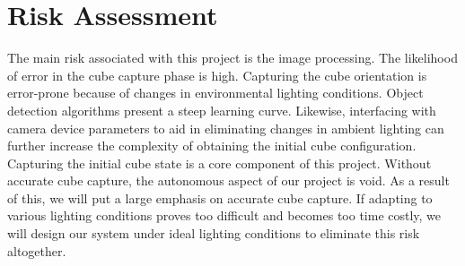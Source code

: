 \documentclass[11pt,english]{article}
\begin{document}
\begin{table}[!ht]
\caption{Main component BOM}
\label{table:BOM}
\end{table}

\section{Risk Assessment}
The main risk associated with this project is the image processing. The likelihood of error in the cube capture phase is high. Capturing the cube orientation is error-prone because of changes in environmental lighting conditions. Object detection algorithms present a steep learning curve. Likewise, interfacing with camera device parameters to aid in eliminating changes in ambient lighting can further increase the complexity of obtaining the initial cube configuration. Capturing the initial cube state is a core component of this project. Without accurate cube capture, the autonomous aspect of our project is void. As a result of this, we will put a large emphasis on accurate cube capture. If adapting to various lighting conditions proves too difficult and becomes too time costly, we will design our system under ideal lighting conditions to eliminate this risk altogether.
\end{document}
